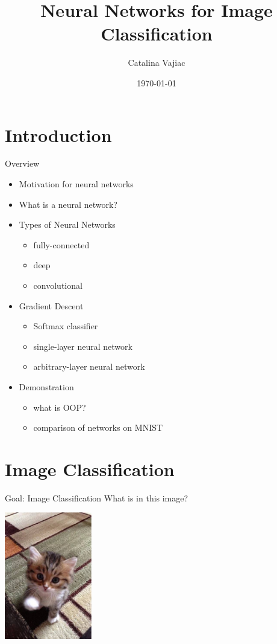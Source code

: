 \documentclass{beamer}
\title{Neural Networks for Image Classification}
\date{\today}
\author{Catalina Vajiac}
\institute{Saint Mary's College}
\begin{document}
  \maketitle

  \section{Introduction}
  \begin{frame}{Overview}
    \begin{itemize}
      \item Motivation for neural networks
      \item What is a neural network?
      \item Types of Neural Networks
      \begin{itemize}
        \item fully-connected
        \item deep
        \item convolutional
      \end{itemize}
      \item Gradient Descent
      \begin{itemize}
        \item Softmax classifier
        \item single-layer neural network
        \item arbitrary-layer neural network
      \end{itemize}
      \item Demonstration
        \begin{itemize}
          \item what is OOP?
          \item comparison of networks on MNIST
        \end{itemize}
    \end{itemize}
  \end{frame}

    \section{Image Classification}
  \begin{frame}{Goal: Image Classification}
     What is in this image?\\
    \begin{center}
      \includegraphics[width=1.5in]{../figures/kitty.eps}
    \end{center}
  \end{frame}
\end{document}
